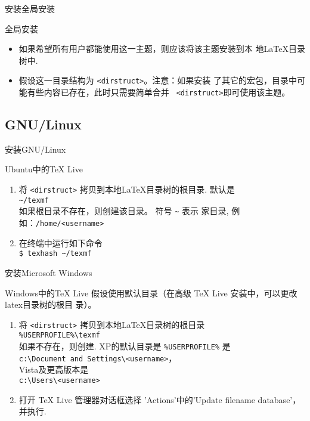 \begin{frame}{安装}{全局安装}
  \begin{block}{全局安装}
    \begin{itemize}
    \item 如果希望所有用户都能使用这一主题，则应该将该主题安装到本
      地{\LaTeX}目录树中.
    \item 假设这一目录结构为 {\tt <dirstruct>}。\alert{注意}：如果安装
      了其它的宏包，目录中可能有些内容已存在，此时只需要简单合并 {\tt
        <dirstruct>}即可使用该主题。
    \end{itemize}
  \end{block}
\end{frame}

\subsection{GNU/Linux}
\begin{frame}{安装}{GNU/Linux}  
  \begin{block}{Ubuntu中的TeX Live}
    \begin{enumerate}
    \item 将 {\tt <dirstruct>} 拷贝到本地{\LaTeX}目录树的根目录. 默认是\\
      {\tt \textasciitilde /texmf}\\
      如果根目录不存在，则创建该目录。 符号 {\tt \textasciitilde} 表示
      家目录, 例如：{\tt /home/<username>}
    \item 在终端中运行如下命令\\
      {\tt \$ texhash \textasciitilde /texmf}
    \end{enumerate}
  \end{block}
\end{frame}

\begin{frame}{安装}{Microsoft Windows}
  \begin{block}{Windows中的TeX Live}
    假设使用默认目录（在高级 TeX Live 安装中，可以更改latex目录树的根目
    录）。
    \begin{enumerate}
    \item 将 {\tt <dirstruct>} 拷贝到本地{\LaTeX}目录树的根目录\\
      {\tt \%USERPROFILE\%\textbackslash texmf}\\
      如果不存在，则创建. XP的默认目录是 {\tt \%USERPROFILE\%} 是\\
      {\tt c:\textbackslash Document and
        Settings\textbackslash<username>}，\\
      Vista及更高版本是\\
      {\tt c:\textbackslash Users\textbackslash<username>}
    \item 打开 TeX Live 管理器对话框选择 'Actions'中的'Update filename
      database'，并执行.
    \end{enumerate}
  \end{block}
\end{frame}


